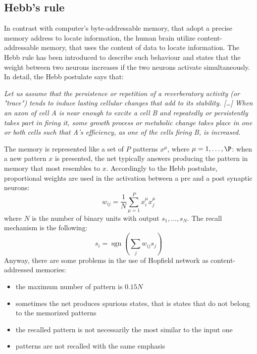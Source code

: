 \documentclass[letterpaper,twocolumn,10pt]{article}
\DeclareMathOperator*{\sign}{sgn}
\begin{document}
\subsection{Hebb's rule}
In contrast with computer's byte-addressable memory, that adopt a precise memory address to locate information, the human brain utilize content-addressable memory, that uses the content of data to locate information. The Hebb rule has been introduced to describe such behaviour and states that the weight between two neurons increases if the two neurons activate simultaneously. In detail, the Hebb postulate says that: 
\begin{center}
\emph{Let us assume that the persistence or repetition of a reverberatory activity (or "trace") tends to induce lasting cellular changes that add to its stability. [\ldots] When an axon of cell A is near enough to excite a cell B and repeatedly or persistently takes part in firing it, some growth process or metabolic change takes place in one or both cells such that A's efficiency, as one of the cells firing B, is increased. }\cite{Hebb49}
\end{center}
The memory is represented like a set of $P$ patterns $x^\mu$, where $\mu = 1,\ldots,\P$: when a new pattern $x$ is presented, the net typically answers producing the pattern in memory that most resembles to $x$. Accordingly to the Hebb postulate, proportional weights are used in the activation between a pre and a post synaptic neurons:
\begin{displaymath}
	w_{ij} = \frac{1}{N} \sum_{\mu = 1}^P x_i^\mu x_j^\mu
\end{displaymath}
where $N$ is the number of binary units with output $s_1,\ldots,s_N$. The recall mechanism is the following:
\begin{displaymath}
	s_i = \sign\left(\sum_j w_{ij} s_j \right)
\end{displaymath}
Anyway, there are some problems in the use of Hopfield network as content-addressed memories:
\begin{itemize}
\item the maximum number of pattern is $0.15N$
\item sometimes the net produces spurious states, that is states that do not belong to the memorized patterns
\item the recalled pattern is not necessarily the most similar to the input one
\item patterns are not recalled with the same emphasis
\end{itemize}
\end{document}
